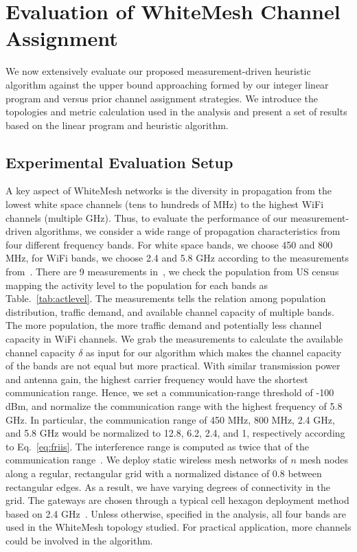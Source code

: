 \section{Evaluation of WhiteMesh Channel Assignment}
\label{sec:experimentdesign}


We now extensively evaluate our proposed measurement-driven heuristic algorithm against the upper 
bound approaching formed by our integer linear program and versus prior channel 
assignment strategies. We introduce the topologies and metric calculation used 
in the analysis and present a set of results based on the linear program and heuristic algorithm.

\subsection{Experimental Evaluation Setup}
\label{subsec:design}
A key aspect of WhiteMesh networks is the diversity in propagation from the lowest white
space channels (tens to hundreds of MHz) to the highest WiFi channels (multiple GHz). Thus, 
to evaluate the performance of our measurement-driven algorithms, we consider a wide range 
of propagation characteristics from four different frequency bands.  For white space bands, 
we choose 450 and 800 MHz, for WiFi bands, we choose 2.4 and 5.8 GHz according to the measurements
from~\cite{pcuiwinmee}. 
There are 9 measurements in~\cite{pcuiwinmee}, we check the population from US census~\cite{uscensus} mapping
the activity level to the population for each bands as Table.~\ref{tab:actlevel}.
The measurements tells the relation among population distribution, traffic demand,
and available channel capacity of multiple bands. The more population, the more traffic demand
and potentially less channel capacity in WiFi channels. We grab the measurements to calculate
the available channel capacity $\delta$ as input for our algorithm which makes the channel 
capacity of the bands are not equal but more practical. With similar transmission
power and antenna gain, the highest carrier frequency would have the shortest communication range.
Hence, we set a communication-range threshold of -100 dBm, and normalize the communication 
range with the highest frequency of 5.8 GHz. In particular, the communication range of 
450 MHz, 800 MHz, 2.4 GHz, and 5.8 GHz would be normalized to 12.8, 6.2, 2.4, and 1, respectively 
according to Eq.~\ref{eq:friis}. The interference range is computed as twice that of the communication 
range~\cite{raniwala2005architecture}. We deploy static wireless mesh networks of $n$ 
mesh nodes along a regular, rectangular grid with a normalized distance of 0.8 between rectangular edges. 
As a result, we have varying degrees of connectivity in the grid.
The gateways are chosen through a typical cell hexagon deployment method based on 2.4 GHz~\cite{meguerdichian2001exposure}.
Unless otherwise, specified in the analysis, all four bands are used in the WhiteMesh
topology studied. For practical application, more channels could be involved in the 
algorithm.

